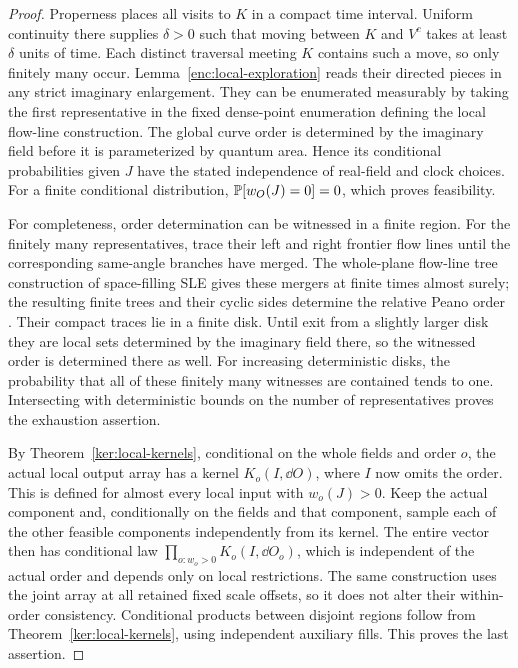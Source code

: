 \begin{proof}
Properness places all visits to \(K\) in a compact time interval.
Uniform continuity there supplies \(\delta>0\) such that moving
between \(K\) and \(V^c\) takes at least \(\delta\) units of time.
Each distinct traversal meeting \(K\) contains such a move, so only
finitely many occur.  Lemma~\ref{enc:local-exploration}
reads their directed pieces in any strict imaginary enlargement.
They can be enumerated measurably by taking the first representative
in the fixed dense-point enumeration defining the local flow-line
construction.  The global curve order is determined by the imaginary
field before it is parameterized by quantum area.  Hence its
conditional probabilities given \(J\) have the stated independence
of real-field and clock choices.  For a finite conditional distribution,
\(\mathbb P[w_O(J)=0]=0\), which proves feasibility.

For completeness, order determination can be witnessed in a finite
region.  For the finitely many representatives, trace their left and
right frontier flow lines until the corresponding same-angle branches
have merged.  The whole-plane flow-line tree construction of
space-filling SLE gives these mergers at finite times almost surely;
the resulting finite trees and their cyclic sides determine the
relative Peano order \cite{MillerSheffieldIGIV}.  Their compact traces lie in a
finite disk.  Until exit from a slightly larger disk they are local
sets determined by the imaginary field there, so the witnessed order
is determined there as well.  For increasing deterministic disks,
the probability that all of these finitely many witnesses are
contained tends to one.  Intersecting with deterministic bounds on
the number of representatives proves the exhaustion assertion.

By Theorem~\ref{ker:local-kernels}, conditional on the whole fields
and order \(o\), the actual local output array has a kernel
\(K_o(I,\dd O)\), where \(I\) now omits the order.  This is defined
for almost every local input with \(w_o(J)>0\).  Keep the actual
component and, conditionally on the fields and that component,
sample each of the other feasible components independently from its
kernel.  The entire vector then has conditional law
\(\prod_{o:w_o>0}K_o(I,\dd O_o)\), which is independent of the actual
order and depends only on local restrictions.  The same construction
uses the joint array at all retained fixed scale offsets, so it does not
alter their within-order consistency.  Conditional products between
disjoint regions follow from Theorem~\ref{ker:local-kernels}, using
independent auxiliary fills.  This proves the last assertion.
\end{proof}


